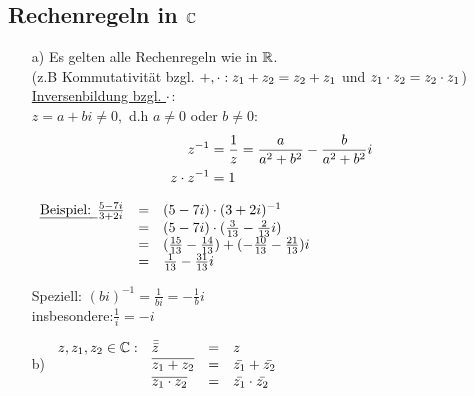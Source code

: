 \subsection{Rechenregeln in $\mathbb{C}$}
\begin{enumerate}
\item[a)]Es gelten alle Rechenregeln wie in $\mathbb{R}$.\\
(z.B Kommutativit\"at bzgl. $+,\cdot:z_1 + z_2 = z_2 + z_1$ und $z_1 \cdot z_2 = z_2 \cdot z_1$)\\
\underline{Inversenbildung bzgl. $\cdot$}:\\
$z = a+bi \not = 0,$ d.h $a \not = 0$ oder $b \not = 0:$\\
\begin{align*}
z^{-1} &= \frac{1}{z} = \frac{a}{a^2 + b^2} - \frac{b}{a^2+b^2}i\\
z \cd z^{-1} &= 1\bigskip
\end{align*}
\begin{minipage}[t]{\textwidth}
$\begin{array}{lcl}
\text{\emph{Beispiel: }}\frac{5-7i}{3+2i} &=& (5-7i) \cdot (3+2i)^{-1}\\
&=& (5-7i) \cdot (\frac{3}{13} -\frac{2}{13}i)\\
&=& (\frac{15}{13}-\frac{14}{13}) +(-\frac{10}{13} -\frac{21}{13})i\\
&=&\frac{1}{13} - \frac{31}{13}i
\end{array}$\bigskip\\
\end{minipage}
Speziell: $(bi)^{-1} = \frac{1}{bi} = -\frac{1}{b}i$ \\
insbesondere:$\frac{1}{i} = -i$
\item[b)]
$\begin{array}{llcl}
z,z_1,z_2 \in \mathbb{C}:&
\bar{\bar{z}}&=&z\\
&\overline{z_1+z_2} &=& \bar{z_1} + \bar{z_2}\\
&\overline{z_1\cdot z_2} &=& \bar{z_1} \cdot \bar{z_2}\\
\end{array}$
\end{enumerate}
